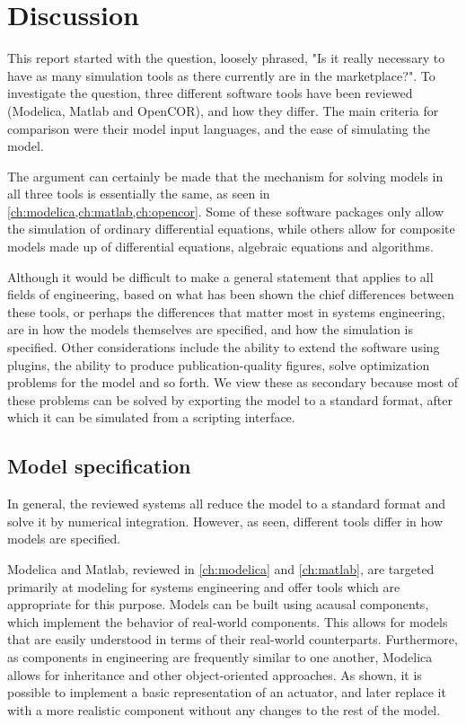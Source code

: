 \documentclass[\rootfolder/main.tex]{subfiles}
\begin{document}
\chapter{Discussion} %

\label{ch:discussion} %

This report started with the question, loosely phrased, "Is it really necessary to have as many simulation tools as there currently are in the marketplace?".
To investigate the question, three different software tools have been reviewed (Modelica, Matlab and OpenCOR), and how they differ.
The main criteria for comparison were their model input languages, and the ease of simulating the model.

The argument can certainly be made that the mechanism for solving models in all three tools is essentially the same, as seen in \cref{ch:modelica,ch:matlab,ch:opencor}.
Some of these software packages only allow the simulation of ordinary differential equations, while others allow for composite models made up of differential equations, algebraic equations and algorithms.

Although it would be difficult to make a general statement that applies to all fields of engineering, based on what has been shown the chief differences between these tools, or perhaps the differences that matter most in systems engineering, are in how the models themselves are specified, and how the simulation is specified.
Other considerations include the ability to extend the software using plugins, the ability to produce publication-quality figures, solve optimization problems for the model and so forth.
We view these as secondary because most of these problems can be solved by exporting the model to a standard format, after which it can be simulated from a scripting interface.

\section{Model specification}

In general, the reviewed systems all reduce the model to a standard format and solve it by numerical integration.
However, as seen, different tools differ in how models are specified.

Modelica and Matlab, reviewed in \cref{ch:modelica} and \cref{ch:matlab}, are targeted primarily at modeling for systems engineering and offer tools which are appropriate for this purpose.
Models can be built using acausal components, which implement the behavior of real-world components.
This allows for models that are easily understood in terms of their real-world counterparts.
Furthermore, as components in engineering are frequently similar to one another, Modelica allows for inheritance and other object-oriented approaches.
As shown, it is possible to implement a basic representation of an actuator, and later replace it with a more realistic component without any changes to the rest of the model.
\end{document}
